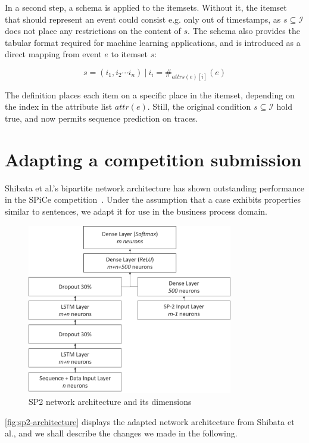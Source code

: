 In a second step, a schema is applied to the itemsets. Without it, the itemset that should represent an event could consist e.g. only out of timestamps, as $s \subseteq \mathscr{I}$ does not place any restrictions on the content of $s$.
The schema also provides the tabular format required for machine learning applications, and is introduced as a direct mapping from event $e$ to itemset $s$:

$$ s = (i_1, i_2 \cdots i_n)\ |\ i_i = \#_{attrs(e)[i]}(e) $$

The definition places each item on a specific place in the itemset, depending on the index in the attribute list $attr(e)$. Still, the original condition $s \subseteq \mathscr{I}$ hold true, and now permits sequence prediction on traces.

\section{Adapting a competition submission}\label{sec:contrib:sp2-inspiration}
Shibata et al.'s bipartite network architecture has shown outstanding performance in the SPiCe competition~\cite{web:spice}. Under the assumption that a case exhibits properties similar to sentences, we adapt it for use in the business process domain.

\begin{figure}[!htb]
    \centering
    \includegraphics[width=0.8\textwidth]{gfx/sp2-network-architecture.png}
    \caption{SP2 network architecture and its dimensions}
    \label{fig:sp2-architecture}
\end{figure}

\autoref{fig:sp2-architecture} displays the adapted network architecture from Shibata et al., and we shall describe the changes we made in the following.

